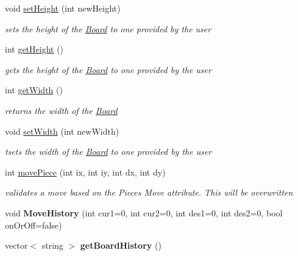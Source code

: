 \begin{DoxyCompactItemize}
\item 
void \hyperlink{classBoard_a7f35e7488ab3d4a72ebb34c56e3b3ec2}{setHeight} (int newHeight)
\begin{DoxyCompactList}\small\item\em sets the height of the \hyperlink{classBoard}{Board} to one provided by the user \item\end{DoxyCompactList}\item 
int \hyperlink{classBoard_a14466e56568d523e5f4d0d695ccbcce1}{getHeight} ()
\begin{DoxyCompactList}\small\item\em gets the height of the \hyperlink{classBoard}{Board} to one provided by the user \item\end{DoxyCompactList}\item 
int \hyperlink{classBoard_a67905f3b441a8605aeb50d8978415aa0}{getWidth} ()
\begin{DoxyCompactList}\small\item\em returns the width of the \hyperlink{classBoard}{Board} \item\end{DoxyCompactList}\item 
void \hyperlink{classBoard_ac1aed85ab99701f68b89d91c225a5ba7}{setWidth} (int newWidth)
\begin{DoxyCompactList}\small\item\em tsets the width of the \hyperlink{classBoard}{Board} to one provided by the user \item\end{DoxyCompactList}\item 
int \hyperlink{classBoard_a0f7aae004483872ecf3c1056ca961fef}{movePiece} (int ix, int iy, int dx, int dy)
\begin{DoxyCompactList}\small\item\em validates a move based on the Pieces Move attribute. This will be overwritten \item\end{DoxyCompactList}\item 
\hypertarget{classBoard_afafbabafdea2ea02d8d6bc57deb68ef9}{
void {\bfseries MoveHistory} (int cur1=0, int cur2=0, int des1=0, int des2=0, bool onOrOff=false)}
\label{classBoard_afafbabafdea2ea02d8d6bc57deb68ef9}

\item 
\hypertarget{classBoard_a74077081ee6423bf1022ffa68bddb9b5}{
vector$<$ string $>$ {\bfseries getBoardHistory} ()}
\label{classBoard_a74077081ee6423bf1022ffa68bddb9b5}

\end{DoxyCompactItemize}


